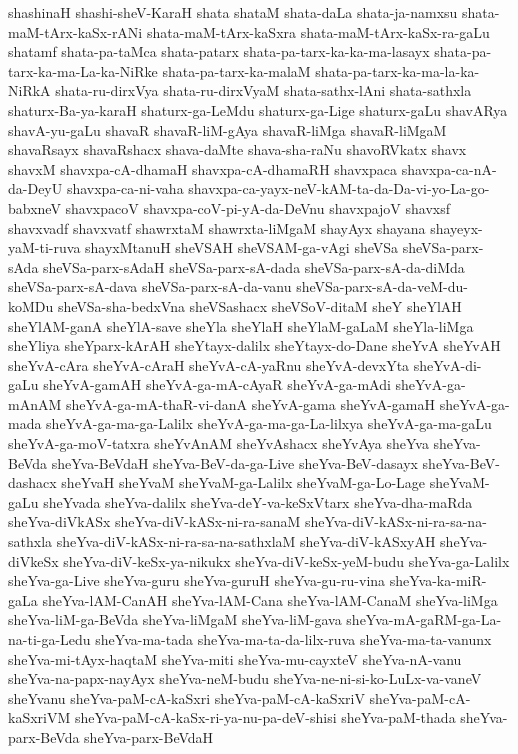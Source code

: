 {shashinaH
shashi-sheV-KaraH
shata
shataM
shata-daLa
shata-ja-namxsu
shata-maM-tArx-kaSx-rANi
shata-maM-tArx-kaSxra
shata-maM-tArx-kaSx-ra-gaLu
shatamf
shata-pa-taMca
shata-patarx
shata-pa-tarx-ka-ka-ma-lasayx
shata-pa-tarx-ka-ma-La-ka-NiRke
shata-pa-tarx-ka-malaM
shata-pa-tarx-ka-ma-la-ka-NiRkA
shata-ru-dirxVya
shata-ru-dirxVyaM
shata-sathx-lAni
shata-sathxla
shaturx-Ba-ya-karaH
shaturx-ga-LeMdu
shaturx-ga-Lige
shaturx-gaLu
shavARya
shavA-yu-gaLu
shavaR
shavaR-liM-gAya
shavaR-liMga
shavaR-liMgaM
shavaRsayx
shavaRshacx
shava-daMte
shava-sha-raNu
shavoRVkatx
shavx
shavxM
shavxpa-cA-dhamaH
shavxpa-cA-dhamaRH
shavxpaca
shavxpa-ca-nA-da-DeyU
shavxpa-ca-ni-vaha
shavxpa-ca-yayx-neV-kAM-ta-da-Da-vi-yo-La-go-babxneV
shavxpacoV
shavxpa-coV-pi-yA-da-DeVnu
shavxpajoV
shavxsf
shavxvadf
shavxvatf
shawrxtaM
shawrxta-liMgaM
shayAyx
shayana
shayeyx-yaM-ti-ruva
shayxMtanuH
sheVSAH
sheVSAM-ga-vAgi
sheVSa
sheVSa-parx-sAda
sheVSa-parx-sAdaH
sheVSa-parx-sA-dada
sheVSa-parx-sA-da-diMda
sheVSa-parx-sA-dava
sheVSa-parx-sA-da-vanu
sheVSa-parx-sA-da-veM-du-koMDu
sheVSa-sha-bedxVna
sheVSashacx
sheVSoV-ditaM
sheY
sheYlAH
sheYlAM-ganA
sheYlA-save
sheYla
sheYlaH
sheYlaM-gaLaM
sheYla-liMga
sheYliya
sheYparx-kArAH
sheYtayx-dalilx
sheYtayx-do-Dane
sheYvA
sheYvAH
sheYvA-cAra
sheYvA-cAraH
sheYvA-cA-yaRnu
sheYvA-devxYta
sheYvA-di-gaLu
sheYvA-gamAH
sheYvA-ga-mA-cAyaR
sheYvA-ga-mAdi
sheYvA-ga-mAnAM
sheYvA-ga-mA-thaR-vi-danA
sheYvA-gama
sheYvA-gamaH
sheYvA-ga-mada
sheYvA-ga-ma-ga-Lalilx
sheYvA-ga-ma-ga-La-lilxya
sheYvA-ga-ma-gaLu
sheYvA-ga-moV-tatxra
sheYvAnAM
sheYvAshacx
sheYvAya
sheYva
sheYva-BeVda
sheYva-BeVdaH
sheYva-BeV-da-ga-Live
sheYva-BeV-dasayx
sheYva-BeV-dashacx
sheYvaH
sheYvaM
sheYvaM-ga-Lalilx
sheYvaM-ga-Lo-Lage
sheYvaM-gaLu
sheYvada
sheYva-dalilx
sheYva-deY-va-keSxVtarx
sheYva-dha-maRda
sheYva-diVkASx
sheYva-diV-kASx-ni-ra-sanaM
sheYva-diV-kASx-ni-ra-sa-na-sathxla
sheYva-diV-kASx-ni-ra-sa-na-sathxlaM
sheYva-diV-kASxyAH
sheYva-diVkeSx
sheYva-diV-keSx-ya-nikukx
sheYva-diV-keSx-yeM-budu
sheYva-ga-Lalilx
sheYva-ga-Live
sheYva-guru
sheYva-guruH
sheYva-gu-ru-vina
sheYva-ka-miR-gaLa
sheYva-lAM-CanAH
sheYva-lAM-Cana
sheYva-lAM-CanaM
sheYva-liMga
sheYva-liM-ga-BeVda
sheYva-liMgaM
sheYva-liM-gava
sheYva-mA-gaRM-ga-La-na-ti-ga-Ledu
sheYva-ma-tada
sheYva-ma-ta-da-lilx-ruva
sheYva-ma-ta-vanunx
sheYva-mi-tAyx-haqtaM
sheYva-miti
sheYva-mu-cayxteV
sheYva-nA-vanu
sheYva-na-papx-nayAyx
sheYva-neM-budu
sheYva-ne-ni-si-ko-LuLx-va-vaneV
sheYvanu
sheYva-paM-cA-kaSxri
sheYva-paM-cA-kaSxriV
sheYva-paM-cA-kaSxriVM
sheYva-paM-cA-kaSx-ri-ya-nu-pa-deV-shisi
sheYva-paM-thada
sheYva-parx-BeVda
sheYva-parx-BeVdaH
}
